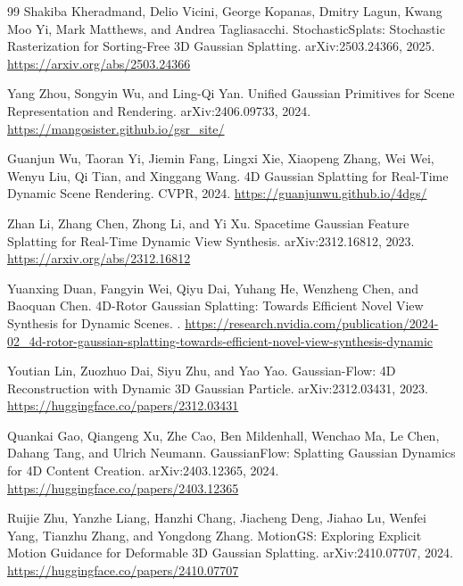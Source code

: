 \documentclass[11pt]{article}
\begin{document}
\begin{thebibliography}{99}
Shakiba Kheradmand, Delio Vicini, George Kopanas, Dmitry Lagun,
Kwang Moo Yi, Mark Matthews, and Andrea Tagliasacchi.
\newblock StochasticSplats: Stochastic Rasterization for Sorting-Free 3D
Gaussian Splatting.
\newblock arXiv:2503.24366, 2025.
\newblock \url{https://arxiv.org/abs/2503.24366}

Yang Zhou, Songyin Wu, and Ling-Qi Yan.
\newblock Unified Gaussian Primitives for Scene Representation and Rendering.
\newblock arXiv:2406.09733, 2024.
\newblock \url{https://mangosister.github.io/gsr_site/}

Guanjun Wu, Taoran Yi, Jiemin Fang, Lingxi Xie, Xiaopeng Zhang, Wei Wei,
Wenyu Liu, Qi Tian, and Xinggang Wang.
\newblock 4D Gaussian Splatting for Real-Time Dynamic Scene Rendering.
\newblock CVPR, 2024.
\newblock \url{https://guanjunwu.github.io/4dgs/}

Zhan Li, Zhang Chen, Zhong Li, and Yi Xu.
\newblock Spacetime Gaussian Feature Splatting for Real-Time Dynamic View
Synthesis.
\newblock arXiv:2312.16812, 2023.
\newblock \url{https://arxiv.org/abs/2312.16812}

Yuanxing Duan, Fangyin Wei, Qiyu Dai, Yuhang He, Wenzheng Chen, and Baoquan Chen.
\newblock 4D-Rotor Gaussian Splatting: Towards Efficient Novel View Synthesis
for Dynamic Scenes.
.
\newblock \url{https://research.nvidia.com/publication/2024-02_4d-rotor-gaussian-splatting-towards-efficient-novel-view-synthesis-dynamic}

Youtian Lin, Zuozhuo Dai, Siyu Zhu, and Yao Yao.
\newblock Gaussian-Flow: 4D Reconstruction with Dynamic 3D Gaussian Particle.
\newblock arXiv:2312.03431, 2023.
\newblock \url{https://huggingface.co/papers/2312.03431}

Quankai Gao, Qiangeng Xu, Zhe Cao, Ben Mildenhall, Wenchao Ma, Le Chen,
Dahang Tang, and Ulrich Neumann.
\newblock GaussianFlow: Splatting Gaussian Dynamics for 4D Content Creation.
\newblock arXiv:2403.12365, 2024.
\newblock \url{https://huggingface.co/papers/2403.12365}

Ruijie Zhu, Yanzhe Liang, Hanzhi Chang, Jiacheng Deng, Jiahao Lu,
Wenfei Yang, Tianzhu Zhang, and Yongdong Zhang.
\newblock MotionGS: Exploring Explicit Motion Guidance for Deformable 3D
Gaussian Splatting.
\newblock arXiv:2410.07707, 2024.
\newblock \url{https://huggingface.co/papers/2410.07707}


\end{thebibliography}
\end{document}
